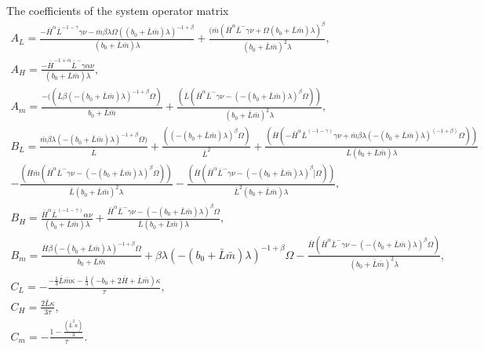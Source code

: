 \documentclass[tc, manuscript]{copernicus}
\begin{document}
The coefficients of the system operator matrix
\begin{multline*}
    A_L = \frac{-\bar{H}^\alpha \bar{L}^{-1 - \gamma} \gamma \nu - \bar{m} \beta \lambda \Omega((b_0 + \bar{L} \bar{m}) \lambda)^{-1 + \beta}}{(b_0 +\bar{L} \bar{m}) \lambda} + \frac{(\bar{m} (\bar{H}^\alpha \bar{L}^-\gamma \nu + \Omega(b_0 + \bar{L} \bar{m}) \lambda)^\beta}{(b_0+ \bar{L} \bar{m})^2 \lambda}, \\
    A_H =  \frac{- \bar{H}^{-1 + \alpha} \bar{L}^-\gamma \alpha \nu}{(b_0 + \bar{L} \bar{m}) \lambda}, \\
    A_m =  \frac{-((\bar{L} \beta (-(b_0 + \bar{L} \bar{m}) \lambda)^{-1 + \beta} \Omega)}{b_0 + \bar{L} \bar{m}} + \frac{(\bar{L} (\bar{H}^\alpha \bar{L}^-\gamma \nu - (-(b_0 + \bar{L} \bar{m}) \lambda)^\beta \Omega))}{(b_0 + \bar{L} \bar{m})^2 \lambda}, \\
    B_L = \frac{\bar{m} \beta \lambda (-(b_0 + \bar{L} \bar{m}) \lambda)^{-1 + \beta} \Omega)}{\bar{L}} + \frac{((-(b_0 + \bar{L} \bar{m}) \lambda)^\beta \Omega)}{\bar{L}^2} + \frac{(\bar{H} (-\bar{H}^\alpha \bar{L}^(-1 - \gamma) \gamma \nu + \bar{m} \beta \lambda (-(b_0 + \bar{L} \bar{m}) \lambda)^(-1 + \beta) \Omega))}{\bar{L} (b_0 + \bar{L} \bar{m}) \lambda} \\
    - \frac{(\bar{H} \bar{m} (\bar{H}^\alpha \bar{L}^-\gamma \nu - (-(b_0 + \bar{L} \bar{m}) \lambda)^\beta \Omega))}{\bar{L} (b_0 + \bar{L} \bar{m})^2 \lambda} - \frac{(\bar{H} (\bar{H}^\alpha \bar{L}^-\gamma \nu - (-(b_0 + \bar{L} \bar{m}) \lambda)^\beta] \Omega))}{\bar{L}^2 (b_0 + \bar{L} \bar{m}) \lambda}, \\
    B_H = \frac{\bar{H}^\alpha \bar{L}^(-1 - \gamma) \alpha \nu}{(b_0 + \bar{L} \bar{m}) \lambda} + \frac{\bar{H}^\alpha \bar{L}^-\gamma \nu - (-(b_0 + \bar{L} \bar{m}) \lambda)^\beta \Omega}{\bar{L} (b_0 +\bar{ L} \bar{m}) \lambda}, \\
    B_m = \frac{\bar{H} \beta (-(b_0 + \bar{L} \bar{m}) \lambda)^{-1 + \beta} \Omega}{b_0 + \bar{L} \bar{m}} + \beta \lambda (-(b_0 + \bar{L} \bar{m}) \lambda)^{-1 + \beta} \Omega - \frac{\bar{H} (\bar{H}^\alpha \bar{L}^-\gamma \nu - (-(b_0 + \bar{L} \bar{m}) \lambda)^\beta \Omega)}{(b_0 + \bar{L} \bar{m})^2 \lambda}, \\
    C_L =-\frac{-\frac{1}{3} \bar{L} \bar{m} \kappa - 
  \frac{1}{3} (-b_0 + 2\bar{H} + \bar{L} \bar{m}) \kappa}{\tau}, \\
    C_H=\frac{2 \bar{L} \kappa}{3 \tau}, \\
    C_m=-\frac{1 - \frac{(\bar{L}^2 \kappa)}{3}}{\tau}. \\
\end{multline*}
     
\end{document}
